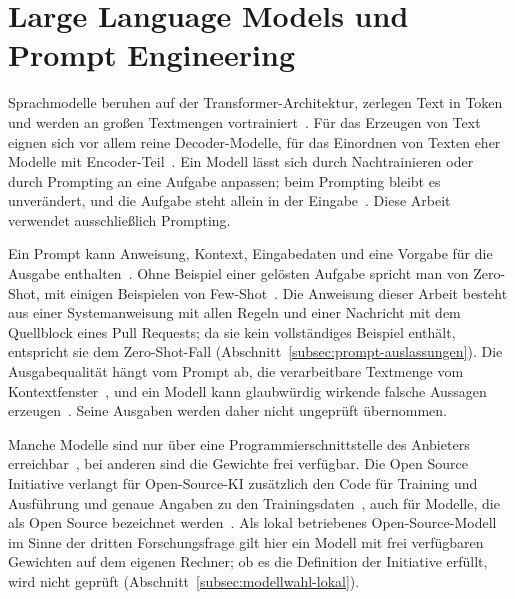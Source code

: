 \documentclass[11pt,a4paper]{report}
\begin{document}
\section{Large Language Models und Prompt Engineering}
\label{sec:llm-grundlagen}

Sprachmodelle beruhen auf der Transformer-Architektur, zerlegen Text in
Token und werden an großen Textmengen
vortrainiert~\cite[Abschn.~2.1, 2.2 und 3.3]{vogelsang2024llm}. Für das
Erzeugen von Text eignen sich vor allem reine Decoder-Modelle, für das
Einordnen von Texten eher Modelle mit Encoder-Teil~\cite[Abschn.~2.3,
2.4 und 3.1]{vogelsang2024llm}. Ein Modell lässt sich durch
Nachtrainieren oder durch Prompting an eine Aufgabe anpassen; beim
Prompting bleibt es unverändert, und die Aufgabe steht allein in der
Eingabe~\cite[Abschn.~3.3 und 3.4]{vogelsang2024llm}. Diese Arbeit
verwendet ausschließlich Prompting.

Ein Prompt kann Anweisung, Kontext, Eingabedaten und eine Vorgabe für
die Ausgabe enthalten~\cite[Abschn.~2.4]{vogelsang2024llm}. Ohne
Beispiel einer gelösten Aufgabe spricht man von Zero-Shot, mit einigen
Beispielen von Few-Shot~\cite[Abschn.~2]{brown2020fewshot}. Die
Anweisung dieser Arbeit besteht aus einer Systemanweisung mit allen
Regeln und einer Nachricht mit dem Quellblock eines Pull Requests; da
sie kein vollständiges Beispiel enthält, entspricht sie dem
Zero-Shot-Fall (Abschnitt~\ref{subsec:prompt-auslassungen}). Die
Ausgabequalität hängt vom Prompt ab, die verarbeitbare Textmenge vom
Kontextfenster~\cite[Abschn.~2.4 und 3.4]{vogelsang2024llm}, und ein
Modell kann glaubwürdig wirkende falsche Aussagen
erzeugen~\cite[LLM09:2025]{owaspllm2025}. Seine Ausgaben werden daher
nicht ungeprüft übernommen.

Manche Modelle sind nur über eine Programmierschnittstelle des
Anbieters erreichbar~\cite[Abschn.~4]{vogelsang2024llm}, bei anderen
sind die Gewichte frei verfügbar. Die Open Source Initiative verlangt
für Open-Source-KI zusätzlich den Code für Training und Ausführung und
genaue Angaben zu den Trainingsdaten~\cite[Abschn.~What is Open Source
AI]{osiaidef2024}, auch für Modelle, die als Open Source bezeichnet
werden~\cite[Abschn.~Open Source models and Open Source
weights]{osiaidef2024}. Als lokal betriebenes Open-Source-Modell im
Sinne der dritten Forschungsfrage gilt hier ein Modell mit frei
verfügbaren Gewichten auf dem eigenen Rechner; ob es die Definition der
Initiative erfüllt, wird nicht geprüft
(Abschnitt~\ref{subsec:modellwahl-lokal}).
\end{document}
